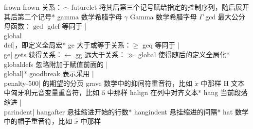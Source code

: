 \capcs frown {frown 关系：$\frown$}{}{}
\capcs futurelet {将其后第三个记号赋给指定的控制序列，随后展开其后第二个记号}*{}
\capcs gamma {数学希腊字母 $\gamma$}{}{}
\capcs Gamma {数学希腊字母 $\Gamma$}{}{}
\capcs gcd {最大公分母函数：$\gcd$}{}{}
\capcs gdef {等同于 |\\global\\def|，即定义全局宏}*{}
\capcs ge {大于或等于关系：$\ge$}{}{}
\capcs geq {等同于 |\\ge|}{}{}
\capcs gets {获得关系：$\gets$}{}{}
\capcs gg {远大于关系：$\gg$}{}{}
\capcs global {使得随后的定义全局化}*{}
\capcs globaldefs {忽略附加于赋值前面的 |\\global|}*{}
\capcs goodbreak {表示采用 |\\penalty-500| 的期望的分页}{}{}
\capcs grave {数学中的抑间符重音符，比如 $\grave x$ 中那样}{}{}
%
\capcs H {文本中匈牙利元音变量重音符，比如 \H o 中那样}{}{}
\capcs halign {在列中对齐文本}*{}
\capcs hang {当前段落缩进 |\\parindent|}{}{}
\capcs hangafter {悬挂缩进开始的行数}*{}
\capcs hangindent {悬挂缩进的间隔}*{}
\capcs hat {数学中的帽子重音符，比如 $\hat x$ 中那样}{}{}
